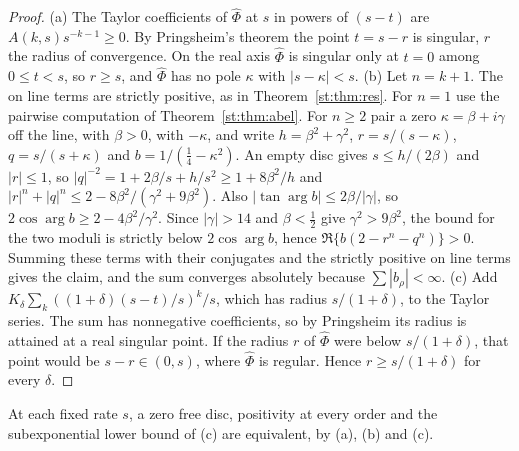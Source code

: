 \begin{proof}
(a) The Taylor coefficients of $\hat\Phi$ at $s$ in powers of $(s-t)$ are $A(k,s)s^{-k-1}\ge0$. By Pringsheim's theorem the point $t=s-r$ is singular, $r$ the radius of convergence. On the real axis $\hat\Phi$ is singular only at $t=0$ among $0\le t<s$, so $r\ge s$, and $\hat\Phi$ has no pole $\kappa$ with $|s-\kappa|<s$. (b) Let $n=k+1$. The on line terms are strictly positive, as in Theorem~\ref{st:thm:res}. For $n=1$ use the pairwise computation of Theorem~\ref{st:thm:abel}. For $n\ge2$ pair a zero $\kappa=\beta+i\gamma$ off the line, with $\beta>0$, with $-\kappa$, and write $h=\beta^2+\gamma^2$, $r=s/(s-\kappa)$, $q=s/(s+\kappa)$ and $b=1/(\tfrac14-\kappa^2)$. An empty disc gives $s\le h/(2\beta)$ and $|r|\le1$, so $|q|^{-2}=1+2\beta/s+h/s^2\ge1+8\beta^2/h$ and $|r|^n+|q|^n\le2-8\beta^2/(\gamma^2+9\beta^2)$. Also $|\tan\arg b|\le2\beta/|\gamma|$, so $2\cos\arg b\ge2-4\beta^2/\gamma^2$. Since $|\gamma|>14$ and $\beta<\tfrac12$ give $\gamma^2>9\beta^2$, the bound for the two moduli is strictly below $2\cos\arg b$, hence $\Re\{b(2-r^n-q^n)\}>0$. Summing these terms with their conjugates and the strictly positive on line terms gives the claim, and the sum converges absolutely because $\sum|b_\rho|<\infty$. (c) Add $K_\delta\sum_k((1+\delta)(s-t)/s)^k/s$, which has radius $s/(1+\delta)$, to the Taylor series. The sum has nonnegative coefficients, so by Pringsheim its radius is attained at a real singular point. If the radius $r$ of $\hat\Phi$ were below $s/(1+\delta)$, that point would be $s-r\in(0,s)$, where $\hat\Phi$ is regular. Hence $r\ge s/(1+\delta)$ for every $\delta$.
\end{proof}
At each fixed rate $s$, a zero free disc, positivity at every order and the subexponential lower bound of (c) are equivalent, by (a), (b) and (c).

